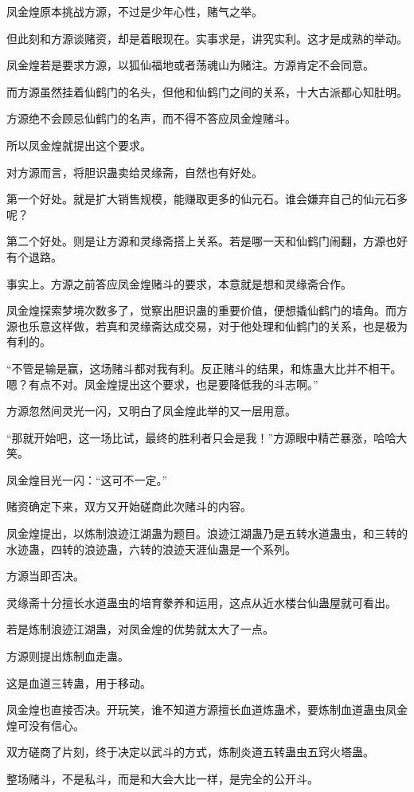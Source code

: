 \begin{this_body}
凤金煌原本挑战方源，不过是少年心性，赌气之举。

但此刻和方源谈赌资，却是着眼现在。实事求是，讲究实利。这才是成熟的举动。

凤金煌若是要求方源，以狐仙福地或者荡魂山为赌注。方源肯定不会同意。

而方源虽然挂着仙鹤门的名头，但他和仙鹤门之间的关系，十大古派都心知肚明。

方源绝不会顾忌仙鹤门的名声，而不得不答应凤金煌赌斗。

所以凤金煌就提出这个要求。

对方源而言，将胆识蛊卖给灵缘斋，自然也有好处。

第一个好处。就是扩大销售规模，能赚取更多的仙元石。谁会嫌弃自己的仙元石多呢？

第二个好处。则是让方源和灵缘斋搭上关系。若是哪一天和仙鹤门闹翻，方源也好有个退路。

事实上。方源之前答应凤金煌赌斗的要求，本意就是想和灵缘斋合作。

凤金煌探索梦境次数多了，觉察出胆识蛊的重要价值，便想撬仙鹤门的墙角。而方源也乐意这样做，若真和灵缘斋达成交易，对于他处理和仙鹤门的关系，也是极为有利的。

“不管是输是赢，这场赌斗都对我有利。反正赌斗的结果，和炼蛊大比并不相干。嗯？有点不对。凤金煌提出这个要求，也是要降低我的斗志啊。”

方源忽然间灵光一闪，又明白了凤金煌此举的又一层用意。

“那就开始吧，这一场比试，最终的胜利者只会是我！”方源眼中精芒暴涨，哈哈大笑。

凤金煌目光一闪：“这可不一定。”

赌资确定下来，双方又开始磋商此次赌斗的内容。

凤金煌提出，以炼制浪迹江湖蛊为题目。浪迹江湖蛊乃是五转水道蛊虫，和三转的水迹蛊，四转的浪迹蛊，六转的浪迹天涯仙蛊是一个系列。

方源当即否决。

灵缘斋十分擅长水道蛊虫的培育豢养和运用，这点从近水楼台仙蛊屋就可看出。

若是炼制浪迹江湖蛊，对凤金煌的优势就太大了一点。

方源则提出炼制血走蛊。

这是血道三转蛊，用于移动。

凤金煌也直接否决。开玩笑，谁不知道方源擅长血道炼蛊术，要炼制血道蛊虫凤金煌可没有信心。

双方磋商了片刻，终于决定以武斗的方式，炼制炎道五转蛊虫五窍火塔蛊。

整场赌斗，不是私斗，而是和大会大比一样，是完全的公开斗。


\end{this_body}
